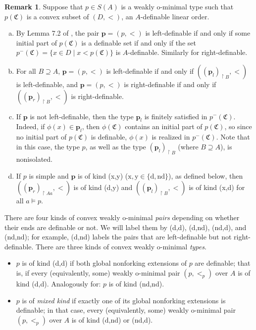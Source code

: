 \documentclass{amsart}
\theoremstyle{definition}
\theoremstyle{definition}
\newtheorem{Remark}[Theorem]{Remark}
\def\strok{\restriction}
\newcommand{\Mon}{\mathfrak C}
\begin{document}
\begin{Remark}\label{remark left right definable} 
Suppose that $p\in S(A)$ is a weakly o-minimal type such that $p(\Mon)$ is a convex subset of $(D,<)$, an $A$-definable linear order. 
\begin{enumerate}[(a)]
    \item By Lemma 7.2 of \cite{MT}, the pair $\mathbf p=(p,<)$ is left-definable if and only if some initial part of $p(\Mon)$ is a definable set if and only if the set $p^-(\Mon)=\{x\in D\mid x<p(\Mon)\}$ is $A$-definable. Similarly for right-definable. 
    \item For all $B\supseteq A$, $\mathbf p=(p,<)$ is left-definable if and only if $((\mathbf p_l)_{\strok B},<)$ is left-definable, and $\mathbf p=(p,<)$ is right-definable if and only if $((\mathbf p_r)_{\strok B},<)$ is right-definable. 
    \item If $\mathbf p$ is not left-definable, then the type $\mathbf p_l$ is finitely satisfied in $p^-(\Mon)$. Indeed, if $\phi(x)\in\mathbf p_l$, then $\phi(\Mon)$ contains an initial part of $p(\Mon)$, so since no initial part of $p(\Mon)$ is definable, $\phi(x)$ is realized in $p^-(\Mon)$. Note that in this case, the type $p$, as well as the type $(\mathbf p_l)_{\strok B}$ (where $B\supseteq A$), is nonisolated. 
    \item If $p$ is simple and $\mathbf p$ is of kind (x,y) ($\mathrm{x,y}\in\{\mathrm{d,nd}\}$), as defined below, then $((\mathbf p_r)_{\strok Aa},<)$ is of kind (d,y) and $((\mathbf p_l)_{\strok B},<)$ is of kind (x,d) for all $a\models p$.
\end{enumerate} 
\end{Remark}

 There are four kinds of convex weakly o-minimal {\it pairs} depending on whether their ends are definable or not. We will label them by (d,d), (d,nd), (nd,d), and (nd,nd); for example, (d,nd) labels the pairs that are left-definable but not right-definable. There are three kinds of convex weakly o-minimal {\it types}.

 \begin{itemize}
     \item $p$ is of kind (d,d) if both global nonforking extensions of $p$ are definable; that is, if every (equivalently, some) weakly o-minimal pair $(p,<_p)$ over $A$ is of kind (d,d). Analogously for: $p$ is of kind (nd,nd). 
     \item $p$ is of {\it mixed kind} if exactly one of its global nonforking extensions is definable; in that case, every (equivalently, some) weakly o-minimal pair $(p,<_p)$ over $A$ is of kind (d,nd) or (nd,d). 
\end{itemize}
\end{document}
